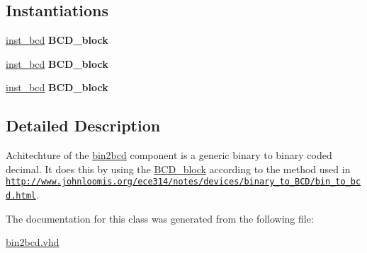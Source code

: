 \subsection*{Instantiations}
 \begin{DoxyCompactItemize}
\item 
\hypertarget{classbin2bcd_1_1Behavioral_ab5107bcdc41f27ec9b85d6915d2b5aa4}{\hyperlink{classbin2bcd_1_1Behavioral_ab5107bcdc41f27ec9b85d6915d2b5aa4}{inst\-\_\-bcd}  {\bfseries B\-C\-D\-\_\-block}   }\label{classbin2bcd_1_1Behavioral_ab5107bcdc41f27ec9b85d6915d2b5aa4}

\item 
\hypertarget{classbin2bcd_1_1Behavioral_ab5107bcdc41f27ec9b85d6915d2b5aa4}{\hyperlink{classbin2bcd_1_1Behavioral_ab5107bcdc41f27ec9b85d6915d2b5aa4}{inst\-\_\-bcd}  {\bfseries B\-C\-D\-\_\-block}   }\label{classbin2bcd_1_1Behavioral_ab5107bcdc41f27ec9b85d6915d2b5aa4}

\item 
\hypertarget{classbin2bcd_1_1Behavioral_ab5107bcdc41f27ec9b85d6915d2b5aa4}{\hyperlink{classbin2bcd_1_1Behavioral_ab5107bcdc41f27ec9b85d6915d2b5aa4}{inst\-\_\-bcd}  {\bfseries B\-C\-D\-\_\-block}   }\label{classbin2bcd_1_1Behavioral_ab5107bcdc41f27ec9b85d6915d2b5aa4}

\end{DoxyCompactItemize}


\subsection{Detailed Description}
Achitechture of the \hyperlink{classbin2bcd}{bin2bcd}  component is a generic binary to binary coded decimal. It does this by using the \hyperlink{classBCD__block}{B\-C\-D\-\_\-block} according to the method used in \href{http://www.johnloomis.org/ece314/notes/devices/binary_to_BCD/bin_to_bcd.html}{\tt http\-://www.\-johnloomis.\-org/ece314/notes/devices/binary\-\_\-to\-\_\-\-B\-C\-D/bin\-\_\-to\-\_\-bcd.\-html}. 

The documentation for this class was generated from the following file\-:\begin{DoxyCompactItemize}
\item 
\hyperlink{bin2bcd_8vhd}{bin2bcd.\-vhd}\end{DoxyCompactItemize}
